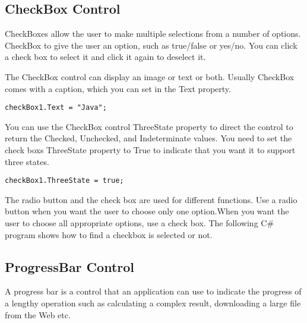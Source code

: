 

\subsection{CheckBox Control}
CheckBoxes allow the user to make multiple selections from a number of options. CheckBox to give the user an option, such as true/false or yes/no. You can click a check box to select it and click it again to deselect it.

The CheckBox control can display an image or text or both. Usually CheckBox comes with a caption, which you can set in the Text property.

\begin{lstlisting}[numbers=none]
checkBox1.Text = "Java";
\end{lstlisting}

You can use the CheckBox control ThreeState property to direct the control to return the Checked, Unchecked, and Indeterminate values. You need to set the check boxs ThreeState property to True to indicate that you want it to support three states.

\begin{lstlisting}[numbers=none]
checkBox1.ThreeState = true;
\end{lstlisting}

The radio button and the check box are used for different functions. Use a radio button when you want the user to choose only one option.When you want the user to choose all appropriate options, use a check box. The following C\# program shows how to find a checkbox is selected or not.



\subsection{ProgressBar Control}
A progress bar is a control that an application can use to indicate the progress of a lengthy operation such as calculating a complex result, downloading a large file from the Web etc.


